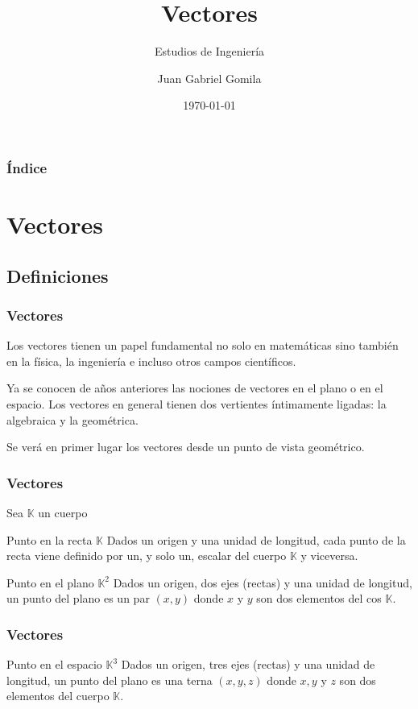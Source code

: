 \documentclass{beamer}
\title[Tema 2 - Vectores]{Vectores}
\subtitle{Estudios de Ingenier\'ia}
\author[https://frogames.es]{
Juan Gabriel Gomila%
}
\institute[Frogames]{
 Frogames
   \and
  \texttt{https://frogames.es}
}
\date{\today}
\begin{document}
 

\frame{\titlepage}

\begin{frame}
  \frametitle{\'Indice}
  \tableofcontents
\end{frame}

\section{Vectores}
\subsection{Definiciones}

\begin{frame}
  \frametitle{Vectores}
Los vectores tienen un papel fundamental no solo en matem\'aticas sino tambi\'en en la f\'isica, la ingenier\'ia e incluso otros campos cient\'ificos.

Ya se conocen de a\~nos anteriores las nociones de vectores en el plano o en el espacio. Los vectores en general tienen dos vertientes \'intimamente ligadas: la algebraica y la geom\'etrica.

Se ver\'a en primer lugar los vectores desde un punto de vista geom\'etrico.

\end{frame}



\begin{frame}
  \frametitle{Vectores}
  Sea $\mathbb{K}$ un cuerpo
  \begin{block}{Punto en la recta $\mathbb{K}$}
Dados un origen y una unidad de longitud, cada punto de la recta viene definido por un, y solo un, escalar del cuerpo $\mathbb{K}$ y viceversa.
  \end{block}

  \begin{block}{Punto en el plano $\mathbb{K}^2$}
Dados un origen, dos ejes (rectas) y una unidad de longitud, un punto del plano es un par $(x,y)$ donde $x$ y $y$ son dos elementos del cos $\mathbb{K}$.
  \end{block}
\end{frame}
  

\begin{frame}
  \frametitle{Vectores}
  \begin{block}{Punto en el espacio $\mathbb{K}^3$}
Dados un origen, tres ejes (rectas) y una unidad de longitud, un punto del plano es una terna $(x,y,z)$ donde $x,y$ y $z$ son dos elementos del cuerpo $\mathbb{K}$.
  \end{block}
\end{frame}
\end{document}
